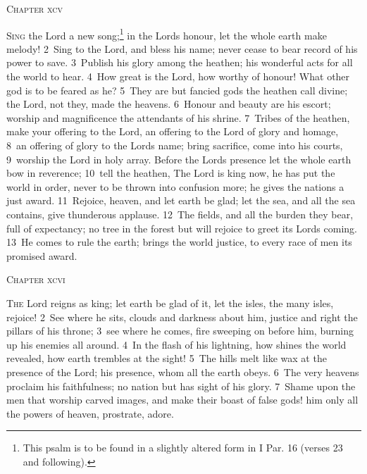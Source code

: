 \documentclass[10pt]{book} %
\begin{document}
\begin{large}\begin{center}\textsc{Chapter xcv}\end{center}\end{large}
\lettrine[lines=2]{S}{ing} the Lord a new song;\footnote[1]{This psalm is to be found in a slightly altered form in I Par. 16 (verses 23 and following).} in the Lord\textquotesingle s honour, let the whole earth make melody! \textcolor{benred8}{2}~Sing to the Lord, and bless his name; never cease to bear record of his power to save. \textcolor{benred8}{3}~Publish his glory among the heathen; his wonderful acts for all the world to hear. \textcolor{benred8}{4}~How great is the Lord, how worthy of honour! What other god is to be feared as he? \textcolor{benred8}{5}~They are but fancied gods the heathen call divine; the Lord, not they, made the heavens. \textcolor{benred8}{6}~Honour and beauty are his escort; worship and magnificence the attendants of his shrine.
\textcolor{benred8}{7}~Tribes of the heathen, make your offering to the Lord, an offering to the Lord of glory and homage, \textcolor{benred8}{8}~an offering of glory to the Lord\textquotesingle s name; bring sacrifice, come into his courts, \textcolor{benred8}{9}~worship the Lord in holy array. Before the Lord\textquotesingle s presence let the whole earth bow in reverence; \textcolor{benred8}{10}~tell the heathen, The Lord is king now, he has put the world in order, never to be thrown into confusion more; he gives the nations a just award. \textcolor{benred8}{11}~Rejoice, heaven, and let earth be glad; let the sea, and all the sea contains, give thunderous applause. \textcolor{benred8}{12}~The fields, and all the burden they bear, full of expectancy; no tree in the forest but will rejoice to greet its Lord\textquotesingle s coming. \textcolor{benred8}{13}~He comes to rule the earth; brings the world justice, to every race of men its promised award.
\begin{large}\begin{center}\textsc{Chapter xcvi}\end{center}\end{large}
\lettrine[lines=2]{T}{he} Lord reigns as king; let earth be glad of it, let the isles, the many isles, rejoice! \textcolor{benred8}{2}~See where he sits, clouds and darkness about him, justice and right the pillars of his throne; \textcolor{benred8}{3}~see where he comes, fire sweeping on before him, burning up his enemies all around. \textcolor{benred8}{4}~In the flash of his lightning, how shines the world revealed, how earth trembles at the sight! \textcolor{benred8}{5}~The hills melt like wax at the presence of the Lord; his presence, whom all the earth obeys. \textcolor{benred8}{6}~The very heavens proclaim his faithfulness; no nation but has sight of his glory. \textcolor{benred8}{7}~Shame upon the men that worship carved images, and make their boast of false gods! him only all the powers of heaven, prostrate, adore.
\end{document}
